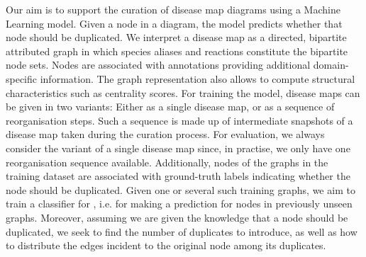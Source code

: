 \documentclass[
	fontsize=10pt, %
	twoside=true, %
	secnumdepth=1, %
  toc=indentunnumbered %
]{kaobook}
\begin{document}
Our aim is to support the curation of disease map diagrams using a Machine
Learning model. Given a node in a diagram, the model predicts whether that node
should be duplicated.
%
We interpret a disease map as a directed, bipartite attributed graph in which
species aliases and reactions constitute the bipartite node sets. Nodes are
associated with annotations providing additional domain-specific information.
The graph representation also allows to compute structural characteristics such
as centrality scores.
%
For training the model, disease maps can be given in two variants: Either as a
single disease map, or as a sequence of reorganisation steps. Such a sequence is
made up of intermediate snapshots of a disease map taken during the curation
process. For evaluation, we always consider the variant of a single disease map
since, in practise, we only have one reorganisation sequence available.
%
Additionally, nodes of the graphs in the training dataset are associated with
ground-truth labels indicating whether the node should be duplicated. Given one
or several such training graphs, we aim to train a classifier for , i.e. for making a prediction for nodes in previously
unseen graphs.
%
Moreover, assuming we are given the knowledge that a node should be duplicated,
we seek to find the number of duplicates to introduce, as well as how to
distribute the edges incident to the original node among its duplicates.


\end{document}
